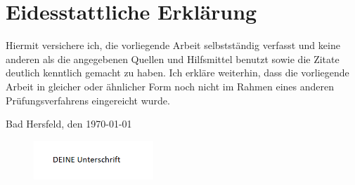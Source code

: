 
\chapter*{Eidesstattliche Erklärung}

Hiermit versichere ich, die vorliegende Arbeit selbstständig verfasst und keine anderen als die angegebenen Quellen und Hilfsmittel benutzt sowie die Zitate deutlich kenntlich gemacht zu haben. Ich erkläre weiterhin, dass die vorliegende Arbeit in gleicher oder ähnlicher Form noch nicht im Rahmen eines anderen Prüfungsverfahrens eingereicht wurde.

\vspace{1cm}
Bad Hersfeld, den \today
\begin{figure}[!hb]
 \includegraphics[width=0.4\textwidth]{Bilder/unterschrift}
\end{figure}

 

